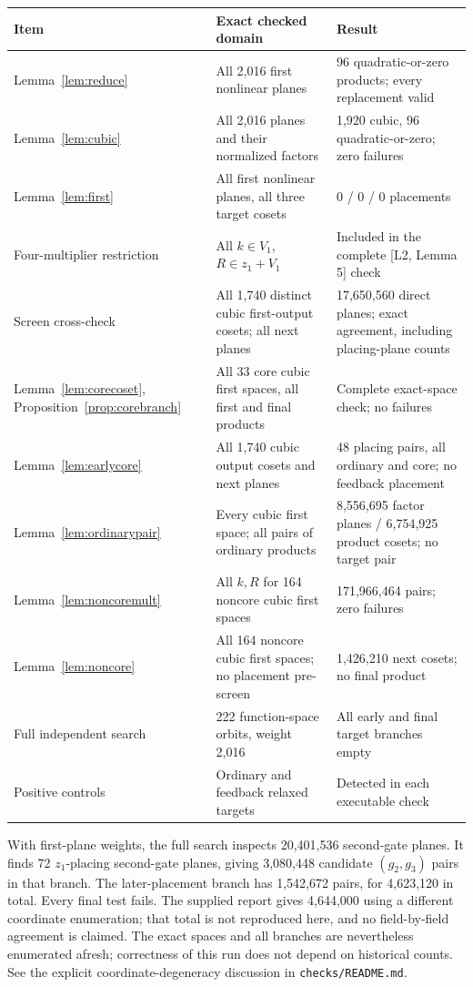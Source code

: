 \documentclass[11pt,a4paper]{article}
\begin{document}
\begin{center}\small
\begin{tabularx}{\textwidth}{@{}l X X@{}}\toprule
Item & Exact checked domain & Result\\\midrule
Lemma~\ref{lem:reduce} & All 2,016 first nonlinear planes & 96 quadratic-or-zero products; every replacement valid\\
Lemma~\ref{lem:cubic} & All 2,016 planes and their normalized factors & 1,920 cubic, 96 quadratic-or-zero; zero failures\\
Lemma~\ref{lem:first} & All first nonlinear planes, all three target cosets & 0 / 0 / 0 placements\\
Four-multiplier restriction & All $k\in V_1$, $R\in z_1+V_1$ & Included in the complete [L2, Lemma 5] check\\
Screen cross-check & All 1,740 distinct cubic first-output cosets; all next planes & 17,650,560 direct planes; exact agreement, including placing-plane counts\\
Lemma~\ref{lem:corecoset}, Proposition~\ref{prop:corebranch} & All 33 core cubic first spaces, all first and final products & Complete exact-space check; no failures\\
Lemma~\ref{lem:earlycore} & All 1,740 cubic output cosets and next planes & 48 placing pairs, all ordinary and core; no feedback placement\\
Lemma~\ref{lem:ordinarypair} & Every cubic first space; all pairs of ordinary products & 8,556,695 factor planes / 6,754,925 product cosets; no target pair\\
Lemma~\ref{lem:noncoremult} & All $k,R$ for 164 noncore cubic first spaces & 171,966,464 pairs; zero failures\\
Lemma~\ref{lem:noncore} & All 164 noncore cubic first spaces; no placement pre-screen & 1,426,210 next cosets; no final product\\
Full independent search & 222 function-space orbits, weight 2,016 & All early and final target branches empty\\
Positive controls & Ordinary and feedback relaxed targets & Detected in each executable check\\\bottomrule
\end{tabularx}\end{center}

With first-plane weights, the full search inspects 20,401,536 second-gate planes. It finds 72 $z_1$-placing second-gate planes, giving 3,080,448 candidate $(g_2,g_3)$ pairs in that branch. The later-placement branch has 1,542,672 pairs, for 4,623,120 in total. Every final test fails. The supplied report gives 4,644,000 using a different coordinate enumeration; that total is not reproduced here, and no field-by-field agreement is claimed. The exact spaces and all branches are nevertheless enumerated afresh; correctness of this run does not depend on historical counts. See the explicit coordinate-degeneracy discussion in \texttt{checks/README.md}.
\end{document}
